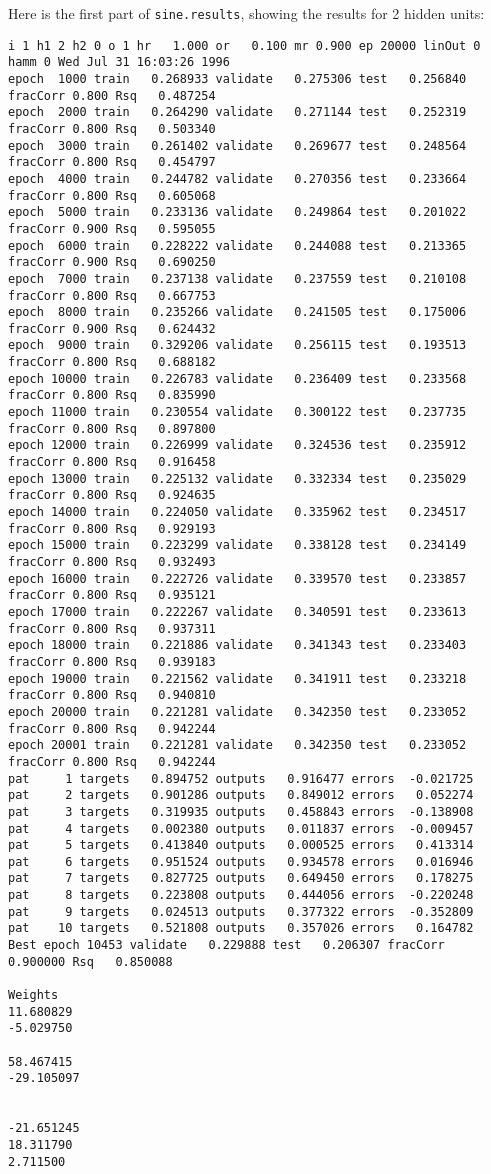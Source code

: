 Here is the first part of \verb`sine.results`, showing the results for 2
hidden units:
\begin{small}
\begin{verbatim}
i 1 h1 2 h2 0 o 1 hr   1.000 or   0.100 mr 0.900 ep 20000 linOut 0 hamm 0 Wed Jul 31 16:03:26 1996
epoch  1000 train   0.268933 validate   0.275306 test   0.256840 fracCorr 0.800 Rsq   0.487254
epoch  2000 train   0.264290 validate   0.271144 test   0.252319 fracCorr 0.800 Rsq   0.503340
epoch  3000 train   0.261402 validate   0.269677 test   0.248564 fracCorr 0.800 Rsq   0.454797
epoch  4000 train   0.244782 validate   0.270356 test   0.233664 fracCorr 0.800 Rsq   0.605068
epoch  5000 train   0.233136 validate   0.249864 test   0.201022 fracCorr 0.900 Rsq   0.595055
epoch  6000 train   0.228222 validate   0.244088 test   0.213365 fracCorr 0.900 Rsq   0.690250
epoch  7000 train   0.237138 validate   0.237559 test   0.210108 fracCorr 0.800 Rsq   0.667753
epoch  8000 train   0.235266 validate   0.241505 test   0.175006 fracCorr 0.900 Rsq   0.624432
epoch  9000 train   0.329206 validate   0.256115 test   0.193513 fracCorr 0.800 Rsq   0.688182
epoch 10000 train   0.226783 validate   0.236409 test   0.233568 fracCorr 0.800 Rsq   0.835990
epoch 11000 train   0.230554 validate   0.300122 test   0.237735 fracCorr 0.800 Rsq   0.897800
epoch 12000 train   0.226999 validate   0.324536 test   0.235912 fracCorr 0.800 Rsq   0.916458
epoch 13000 train   0.225132 validate   0.332334 test   0.235029 fracCorr 0.800 Rsq   0.924635
epoch 14000 train   0.224050 validate   0.335962 test   0.234517 fracCorr 0.800 Rsq   0.929193
epoch 15000 train   0.223299 validate   0.338128 test   0.234149 fracCorr 0.800 Rsq   0.932493
epoch 16000 train   0.222726 validate   0.339570 test   0.233857 fracCorr 0.800 Rsq   0.935121
epoch 17000 train   0.222267 validate   0.340591 test   0.233613 fracCorr 0.800 Rsq   0.937311
epoch 18000 train   0.221886 validate   0.341343 test   0.233403 fracCorr 0.800 Rsq   0.939183
epoch 19000 train   0.221562 validate   0.341911 test   0.233218 fracCorr 0.800 Rsq   0.940810
epoch 20000 train   0.221281 validate   0.342350 test   0.233052 fracCorr 0.800 Rsq   0.942244
epoch 20001 train   0.221281 validate   0.342350 test   0.233052 fracCorr 0.800 Rsq   0.942244
pat     1 targets   0.894752 outputs   0.916477 errors  -0.021725
pat     2 targets   0.901286 outputs   0.849012 errors   0.052274
pat     3 targets   0.319935 outputs   0.458843 errors  -0.138908
pat     4 targets   0.002380 outputs   0.011837 errors  -0.009457
pat     5 targets   0.413840 outputs   0.000525 errors   0.413314
pat     6 targets   0.951524 outputs   0.934578 errors   0.016946
pat     7 targets   0.827725 outputs   0.649450 errors   0.178275
pat     8 targets   0.223808 outputs   0.444056 errors  -0.220248
pat     9 targets   0.024513 outputs   0.377322 errors  -0.352809
pat    10 targets   0.521808 outputs   0.357026 errors   0.164782
Best epoch 10453 validate   0.229888 test   0.206307 fracCorr   0.900000 Rsq   0.850088

Weights
11.680829
-5.029750

58.467415
-29.105097


-21.651245
18.311790
2.711500
\end{verbatim}
\end{small}

